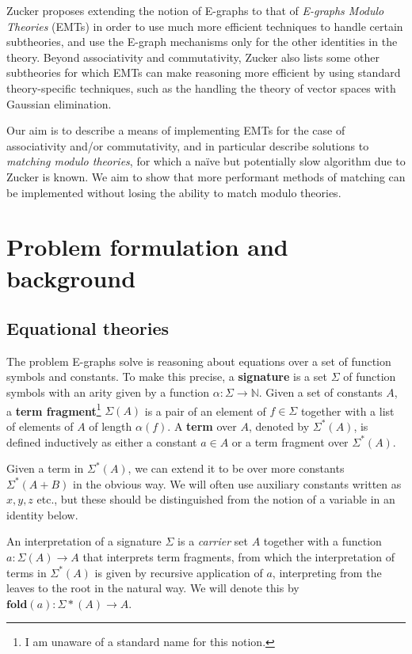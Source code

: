 \documentclass{article}
\theoremstyle{definition}
\begin{document}
Zucker \cite{zucker2025omelets} proposes extending the notion of E-graphs to that of \textit{E-graphs Modulo Theories} (EMTs) in order to use much more efficient techniques to handle certain subtheories, and use the E-graph mechanisms only for the other identities in the theory. Beyond associativity and commutativity, Zucker also lists some other subtheories for which EMTs can make reasoning more efficient by using standard theory-specific techniques, such as the handling the theory of vector spaces with Gaussian elimination.

Our aim is to describe a means of implementing EMTs for the case of associativity and/or commutativity, and in particular describe solutions to \textit{matching modulo theories}, for which a na\"ive but potentially slow algorithm due to Zucker is known. We aim to show that more performant methods of matching can be implemented without losing the ability to match modulo theories.

\section{Problem formulation and background}
\subsection{Equational theories}
The problem E-graphs solve is reasoning about equations over a set of function symbols and constants. To make this precise, a \textbf{signature} is a set $\Sigma$ of function symbols with an arity given by a function $\alpha : \Sigma \rightarrow \mathbb{N}$. Given a set of constants $A$, a \textbf{term fragment}\footnote{I am unaware of a standard name for this notion.} $\Sigma(A)$ is a pair of an element of $f \in \Sigma$ together with a list of elements of $A$ of length $\alpha(f)$. A \textbf{term} over $A$, denoted by $\Sigma^*(A)$, is defined inductively as either a constant $a \in A$ or a term fragment over $\Sigma^*(A)$.

Given a term in $\Sigma^*(A)$, we can extend it to be over more constants $\Sigma^*(A + B)$ in the obvious way. We will often use auxiliary constants written as $x, y, z$ etc., but these should be distinguished from the notion of a variable in an identity below.

An interpretation of a signature $\Sigma$ is a \textit{carrier} set $A$ together with a function $a : \Sigma(A) \rightarrow A$ that interprets term fragments, from which the interpretation of terms in $\Sigma^*(A)$ is given by recursive application of $a$, interpreting from the leaves to the root in the natural way. We will denote this by $\textbf{fold}(a) : \Sigma*(A) \rightarrow A$.
\end{document}
